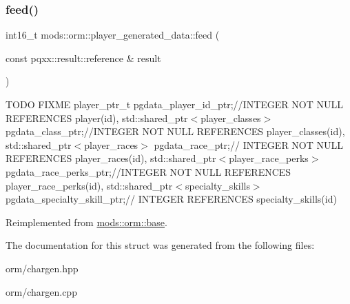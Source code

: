 \subsubsection{\texorpdfstring{feed()}{feed()}}
{\footnotesize\ttfamily int16\+\_\+t mods\+::orm\+::player\+\_\+generated\+\_\+data\+::feed (\begin{DoxyParamCaption}\item[{const pqxx\+::result\+::reference \&}]{result }\end{DoxyParamCaption})\hspace{0.3cm}{\ttfamily [virtual]}}

T\+O\+DO F\+I\+X\+ME player\+\_\+ptr\+\_\+t pgdata\+\_\+player\+\_\+id\+\_\+ptr;//\+I\+N\+T\+E\+G\+ER N\+OT N\+U\+LL R\+E\+F\+E\+R\+E\+N\+C\+ES player(id), std\+::shared\+\_\+ptr$<$player\+\_\+classes$>$ pgdata\+\_\+class\+\_\+ptr;//\+I\+N\+T\+E\+G\+ER N\+OT N\+U\+LL R\+E\+F\+E\+R\+E\+N\+C\+ES player\+\_\+classes(id), std\+::shared\+\_\+ptr$<$player\+\_\+races$>$ pgdata\+\_\+race\+\_\+ptr;// I\+N\+T\+E\+G\+ER N\+OT N\+U\+LL R\+E\+F\+E\+R\+E\+N\+C\+ES player\+\_\+races(id), std\+::shared\+\_\+ptr$<$player\+\_\+race\+\_\+perks$>$ pgdata\+\_\+race\+\_\+perks\+\_\+ptr;//\+I\+N\+T\+E\+G\+ER N\+OT N\+U\+LL R\+E\+F\+E\+R\+E\+N\+C\+ES player\+\_\+race\+\_\+perks(id), std\+::shared\+\_\+ptr$<$specialty\+\_\+skills$>$ pgdata\+\_\+specialty\+\_\+skill\+\_\+ptr;// I\+N\+T\+E\+G\+ER R\+E\+F\+E\+R\+E\+N\+C\+ES specialty\+\_\+skills(id)

Reimplemented from \hyperlink{structmods_1_1orm_1_1base}{mods\+::orm\+::base}.



The documentation for this struct was generated from the following files\+:\begin{DoxyCompactItemize}
\item 
orm/chargen.\+hpp\item 
orm/chargen.\+cpp\end{DoxyCompactItemize}
